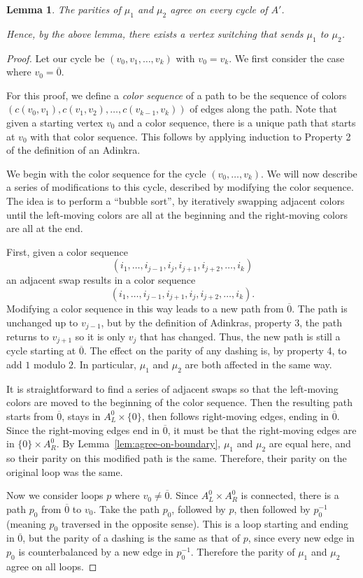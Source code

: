\documentclass[12pt,twoside,singlespace]{article}
\numberwithin{equation}{section}
\newtheorem{lem}[equation]{Lemma}
\theoremstyle{definition}
\begin{document}
\begin{lem}
\label{lem:switch12}
The parities of $\mu_1$ and $\mu_2$ agree on every cycle of $A'$.

Hence, by the above lemma, there exists a vertex switching that sends $\mu_1$ to $\mu_2$.
\end{lem}
\begin{proof}
Let our cycle be $(v_0,v_1,\ldots,v_k)$ with $v_0=v_k$.  We first consider the case where $v_0=\overline{0}$.

For this proof, we define a \emph{color sequence} of a path to be the sequence of colors $(c(v_0,v_1),c(v_1,v_2),\ldots,c(v_{k-1},v_k))$ of edges along the path.  Note that given a starting vertex $v_0$ and a color sequence, there is a unique path that starts at $v_0$ with that color sequence.  This follows by applying induction to Property 2 of the definition of an Adinkra.

We begin with the color sequence for the cycle $(v_0,\ldots,v_k)$.  We will now describe a series of modifications to this cycle, described by modifying the color sequence.  The idea is to perform a ``bubble sort'', by iteratively swapping adjacent colors until the left-moving colors are all at the beginning and the right-moving colors are all at the end.

First, given a color sequence
\[(i_1,\ldots,i_{j-1},i_j,i_{j+1},i_{j+2},\ldots,i_k)\]
an adjacent swap results in a color sequence
\[(i_1,\ldots,i_{j-1},i_{j+1},i_j,i_{j+2},\ldots,i_k).\]
Modifying a color sequence in this way leads to a new path from $\overline{0}$.  The path is unchanged up to $v_{j-1}$, but by the definition of Adinkras, property 3, the path returns to $v_{j+1}$ so it is only $v_j$ that has changed.  Thus, the new path is still a cycle starting at $\overline{0}$.  The effect on the parity of any dashing is, by property 4, to add $1$ modulo $2$.  In particular, $\mu_1$ and $\mu_2$ are both affected in the same way.

It is straightforward to find a series of adjacent swaps so that the left-moving colors are moved to the beginning of the color sequence.  Then the resulting path starts from $\overline{0}$, stays in $A_L^0\times\{0\}$, then follows right-moving edges, ending in $\overline{0}$.  Since the right-moving edges end in $\overline{0}$, it must be that the right-moving edges are in $\{0\}\times A_R^0$.  By Lemma~\ref{lem:agree-on-boundary}, $\mu_1$ and $\mu_2$ are equal here, and so their parity on this modified path is the same.  Therefore, their parity on the original loop was the same.

Now we consider loops $p$ where $v_0\not=\overline{0}$.  Since $A_L^0\times A_R^0$ is connected, there is a path $p_0$ from $\overline{0}$ to $v_0$.  Take the path $p_0$, followed by $p$, then followed by $p_0^{-1}$ (meaning $p_0$ traversed in the opposite sense).  This is a loop starting and ending in $\overline{0}$, but the parity of a dashing is the same as that of $p$, since every new edge in $p_0$ is counterbalanced by a new edge in $p_0^{-1}$.  Therefore the parity of $\mu_1$ and $\mu_2$ agree on all loops.
\end{proof}
\end{document}
